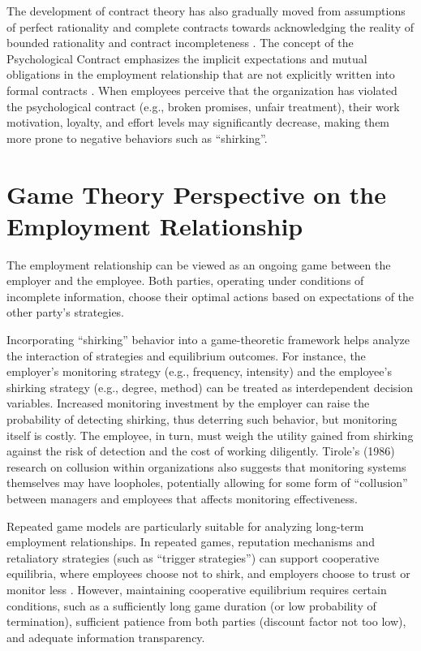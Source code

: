 The development of contract theory has also gradually moved from assumptions of perfect rationality and complete contracts towards acknowledging the reality of bounded rationality and contract incompleteness \citep{hart1995firms}. The concept of the Psychological Contract emphasizes the implicit expectations and mutual obligations in the employment relationship that are not explicitly written into formal contracts \citep{rousseau1995psychological}. When employees perceive that the organization has violated the psychological contract (e.g., broken promises, unfair treatment), their work motivation, loyalty, and effort levels may significantly decrease, making them more prone to negative behaviors such as \enquote{shirking}.

\section{Game Theory Perspective on the Employment Relationship}

The employment relationship can be viewed as an ongoing game between the employer and the employee. Both parties, operating under conditions of incomplete information, choose their optimal actions based on expectations of the other party's strategies.

Incorporating \enquote{shirking} behavior into a game-theoretic framework helps analyze the interaction of strategies and equilibrium outcomes. For instance, the employer's monitoring strategy (e.g., frequency, intensity) and the employee's shirking strategy (e.g., degree, method) can be treated as interdependent decision variables. Increased monitoring investment by the employer can raise the probability of detecting shirking, thus deterring such behavior, but monitoring itself is costly. The employee, in turn, must weigh the utility gained from shirking against the risk of detection and the cost of working diligently. Tirole's (1986) \nocite{tirole1986hierarchies} research on collusion within organizations also suggests that monitoring systems themselves may have loopholes, potentially allowing for some form of \enquote{collusion} between managers and employees that affects monitoring effectiveness.

Repeated game models are particularly suitable for analyzing long-term employment relationships. In repeated games, reputation mechanisms and retaliatory strategies (such as \enquote{trigger strategies}) can support cooperative equilibria, where employees choose not to shirk, and employers choose to trust or monitor less \citep{axelrod1984evolution}. However, maintaining cooperative equilibrium requires certain conditions, such as a sufficiently long game duration (or low probability of termination), sufficient patience from both parties (discount factor not too low), and adequate information transparency.

